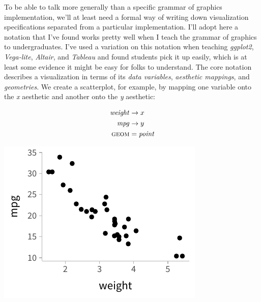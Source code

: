 \documentclass[journal]{vgtc}                     %
\begin{document}
To be able to talk more generally than a specific grammar of graphics implementation, we'll at least need a formal way of writing down visualization specifications separated from a particular implementation. I'll adopt here a notation that I've found works pretty well when I teach the grammar of graphics to undergraduates. I've used a variation on this notation when teaching \textit{ggplot2}, \textit{Vega-lite}, \textit{Altair}, and \textit{Tableau} and found students pick it up easily, which is at least some evidence it might be easy for folks to understand. The core notation describes a visualization in terms of its \textit{data variables}, \textit{aesthetic mappings}, and \textit{geometries}. We create a scatterplot, for example, by mapping one variable onto the \textit{x} aesthetic and another onto the \textit{y} aesthetic:

\hfill\break
  \begin{minipage}{.5\columnwidth}
    \begin{align*}
\mathit{weight} &\rightarrow x\\
\mathit{mpg} &\rightarrow y\\
\textsc{geom} &= \mathit{point}
\end{align*}
  \end{minipage}%
  \begin{minipage}{.4\columnwidth}
    \centering
    \includegraphics[width=1.2\columnwidth]{figs/2-mpg_v_weight.pdf}
  \end{minipage}
\end{document}
